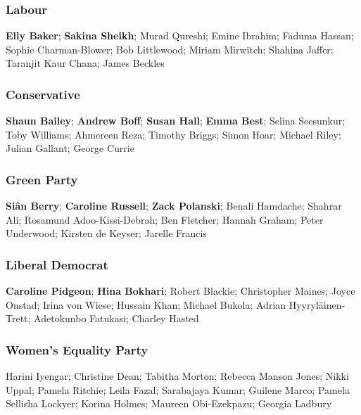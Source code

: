 \begin{resultsiii}
	
	\subsubsection*{Labour}
	\textbf{Elly Baker}; \textbf{Sakina Sheikh}; Murad Qureshi; Emine Ibrahim; Faduma Hassan; Sophie Charman-Blower; Bob Littlewood; Miriam Mirwitch; Shahina Jaffer; Taranjit Kaur Chana; James Beckles
	
	\subsubsection*{Conservative}
	\textbf{Shaun Bailey}; \textbf{Andrew Boff}; \textbf{Susan Hall}; \textbf{Emma Best}; Selina Seesunkur; Toby Williams; Ahmereen Reza; Timothy Briggs; Simon Hoar; Michael Riley; Julian Gallant; George Currie
	
	
	\subsubsection*{Green Party}
	\textbf{Siân Berry}; \textbf{Caroline Russell}; \textbf{Zack Polanski}; Benali Hamdache; Shahrar Ali; Rosamund Adoo-Kissi-Debrah; Ben Fletcher; Hannah Graham; Peter Underwood; Kirsten de Keyser; Jarelle Francis
	
	
	\subsubsection*{Liberal Democrat}
	\textbf{Caroline Pidgeon}; \textbf{Hina Bokhari}; Robert Blackie; Christopher Maines; Joyce Onstad; Irina von Wiese; Hussain Khan; Michael Bukola; Adrian Hyyryläinen-Trett; Adetokunbo Fatukasi; Charley Hasted
	

	\subsubsection*{Women's Equality Party}
	Harini Iyengar; Christine Dean; Tabitha Morton; Rebecca Manson Jones; Nikki Uppal; Pamela Ritchie; Leila Fazal; Sarabajaya Kumar; Guilene Marco; Pamela Sellisha Lockyer; Korina Holmes; Maureen Obi-Ezekpazu; Georgia Ladbury


\end{resultsiii}
